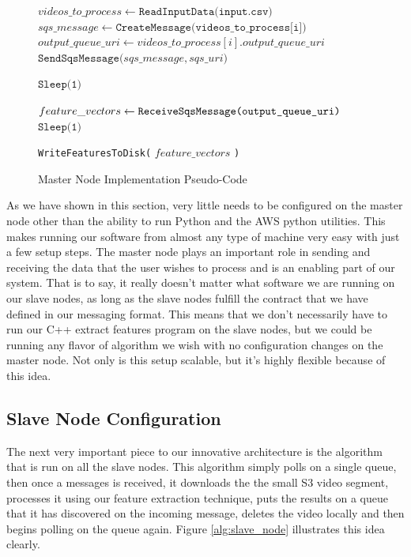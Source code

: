 \begin{figure}[h]
\begin{algorithmic}[1]
  \State $videos\_to\_process \gets \texttt{ReadInputData(input.csv)}$
    \State $sqs\_message \gets \texttt{CreateMessage(videos\_to\_process[i])}$
    \State $output\_queue\_uri \gets videos\_to\_process[i].output\_queue\_uri$
    \State$\texttt{SendSqsMessage(}sqs\_message, sqs\_uri \texttt{)}$
  \EndFor

   
    \State $\texttt{Sleep(1)}$
  \EndWhile

    \State $feature\_vectors \gets \texttt{ReceiveSqsMessage(output\_queue\_uri\texttt{)}}$
    \State $\texttt{Sleep(1)}$
  \EndWhile

  \State \texttt{WriteFeaturesToDisk(} $feature\_vectors$ \texttt{)}

\end{algorithmic}
\caption{Master Node Implementation Pseudo-Code}
\label{alg:master_node}
\end{figure}

As we have shown in this section, very little needs to be configured on the master
node other than the ability to run Python and the AWS python utilities. This
makes running our software from almost any type of machine very easy with just a
few setup steps. The master node plays an important role in sending and receiving
the data that the user wishes to process and is an enabling part of our system.
That is to say, it really doesn't matter what software we are running on our
slave nodes, as long as the slave nodes fulfill the contract that we have
defined in our messaging format. This means that we don't necessarily have to
run our C++ extract features program on the slave nodes, but we could be running
any flavor of algorithm we wish with no configuration changes on the master node.
Not only is this setup scalable, but it's highly flexible because of this idea.

\subsection{\label{subsection:slave_node}Slave Node Configuration }
The next very important piece to our innovative architecture is the algorithm
that is run on all the slave nodes. This algorithm simply polls on a single
queue, then once a messages is received, it downloads the the small S3 video
segment, processes it using our feature extraction technique, puts the results
on a queue that it has discovered on the incoming message, deletes the video
locally and then begins polling on the queue again. Figure \ref{alg:slave_node}
illustrates this idea clearly.

